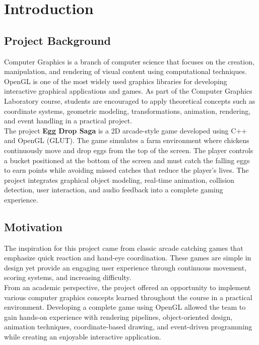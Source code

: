 \documentclass[12pt,a4paper]{report}
\begin{document}
\chapter{Introduction}


\section{Project Background}

Computer Graphics is a branch of computer science that focuses on the creation, manipulation, and rendering of visual content using computational techniques. OpenGL is one of the most widely used graphics libraries for developing interactive graphical applications and games. As part of the Computer Graphics Laboratory course, students are encouraged to apply theoretical concepts such as coordinate systems, geometric modeling, transformations, animation, rendering, and event handling in a practical project.\\

The project \textbf{Egg Drop Saga} is a 2D arcade-style game developed using C++ and OpenGL (GLUT). The game simulates a farm environment where chickens continuously move and drop eggs from the top of the screen. The player controls a bucket positioned at the bottom of the screen and must catch the falling eggs to earn points while avoiding missed catches that reduce the player's lives. The project integrates graphical object modeling, real-time animation, collision detection, user interaction, and audio feedback into a complete gaming experience.

\section{Motivation}

The inspiration for this project came from classic arcade catching games that emphasize quick reaction and hand-eye coordination. These games are simple in design yet provide an engaging user experience through continuous movement, scoring systems, and increasing difficulty. \\

From an academic perspective, the project offered an opportunity to implement various computer graphics concepts learned throughout the course in a practical environment. Developing a complete game using OpenGL allowed the team to gain hands-on experience with rendering pipelines, object-oriented design, animation techniques, coordinate-based drawing, and event-driven programming while creating an enjoyable interactive application.
\end{document}
